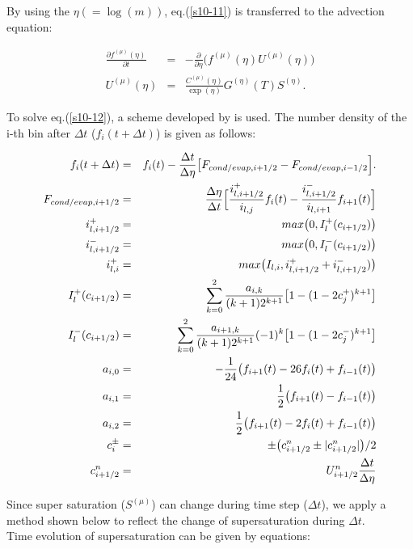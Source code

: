 By using the $\eta(=\log(m))$, eq.(\ref{s10-11}) is transferred to the advection equation:

\begin{eqnarray}
\frac{\partial f^{(\mu)}(\eta)}{\partial t}&=&-\frac{\partial}{\partial \eta}\bigl ( f^{(\mu)}(\eta)U^{(\mu)}(\eta)\bigr)\label{s10-12}\\
U^{(\mu)}(\eta)&=&\frac{C^{(\mu)}(\eta)}{\exp (\eta)}G^{(\eta)}(T)S^{(\eta)}.\nonumber
\end{eqnarray}

To solve eq.(\ref{s10-12}), a scheme developed by \cite{bott_1989} is used. The number density of the i-th bin after $\Delta t$ ($f_{i}(t+\Delta t)$) is given as follows:

\begin{eqnarray}
f_{i}(t+\Delta t)&=&f_{i}(t)-\frac{\Delta t}{\Delta \eta}\bigl [F_{cond/evap,i+1/2}-F_{cond/evap,i-1/2}\Bigr ].\nonumber\\
F_{cond/evap,i+1/2}&=&\frac{\Delta \eta}{\Delta t}\Bigl[ \frac{i^{+}_{l,i+1/2}}{i_{l,j}}f_{i}(t)-\frac{i^{-}_{l,i+1/2}}{i_{l,i+1}}f_{i+1}(t)\Bigr ]\nonumber\\
i^{+}_{l,i+1/2}&=&max\bigl(0,I^{+}_{l}(c_{i+1/2})\bigr)\nonumber\\
i^{-}_{l,i+1/2}&=&max\bigl(0,I^{-}_{l}(c_{i+1/2})\bigr)\nonumber\\
i^{+}_{l,i}&=&max\bigl(I_{l,i},i^{+}_{l,i+1/2}+i^{-}_{l,i+1/2})\bigr)\nonumber\\
I^{+}_{l}(c_{i+1/2})&=&\sum_{k=0}^{2}\frac{a_{i,k}}{(k+1)2^{k+1}}\bigl[1-(1-2c^{+}_{j})^{k+1}\bigr]\nonumber\\
I^{-}_{l}(c_{i+1/2})&=&\sum_{k=0}^{2}\frac{a_{i+1,k}}{(k+1)2^{k+1}}(-1)^{k}\bigl[1-(1-2c^{-}_{j})^{k+1}\bigr]\nonumber\\
a_{i,0}&=&-\frac{1}{24}\bigl( f_{i+1}(t)-26f_{i}(t)+f_{i-1}(t) \bigr)\nonumber\\
a_{i,1}&=&\frac{1}{2}\bigl( f_{i+1}(t)-f_{i-1}(t) \bigr)\nonumber\\
a_{i,2}&=&\frac{1}{2}\bigl( f_{i+1}(t)-2f_{i}(t)+f_{i-1}(t) \bigr)\nonumber\\
c_{i}^{\pm}&=&\pm\bigl( c^{n}_{i+1/2}\pm | c^{n}_{i+1/2}|\bigr )/2\nonumber\\
c^{n}_{i+1/2}&=&U^{n}_{i+1/2}\frac{\Delta t}{\Delta \eta}
\end{eqnarray}

Since super saturation ($S^{(\mu)}$) can change during time step ($\Delta t$), we apply a method shown below to reflect the change of supersaturation during $\Delta t$.\\
Time evolution of supersaturation can be given by equations:

